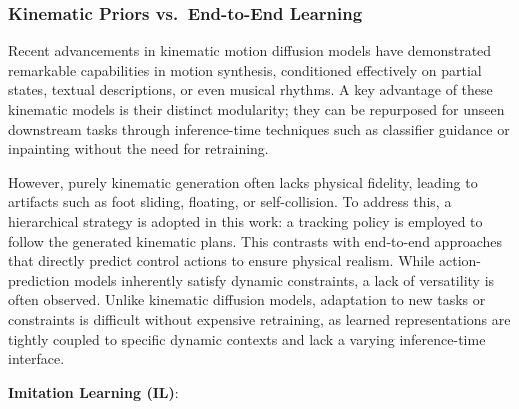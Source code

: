 \subsubsection{Kinematic Priors vs.~End-to-End Learning}
Recent advancements
in kinematic motion diffusion models have demonstrated remarkable
capabilities in motion synthesis, conditioned effectively on partial
states, textual descriptions, or even musical rhythms. A key advantage
of these kinematic models is their distinct modularity; they can be
repurposed for unseen downstream tasks through inference-time techniques
such as classifier guidance or inpainting without the need for
retraining.

However, purely kinematic generation often lacks physical fidelity,
leading to artifacts such as foot sliding, floating, or self-collision.
To address this, a hierarchical strategy is adopted in this work: a
tracking policy is employed to follow the generated kinematic plans.
This contrasts with end-to-end approaches that directly predict control
actions to ensure physical realism. While action-prediction models
inherently satisfy dynamic constraints, a lack of versatility is often
observed. Unlike kinematic diffusion models, adaptation to new tasks or
constraints is difficult without expensive retraining, as learned
representations are tightly coupled to specific dynamic contexts and
lack a varying inference-time interface.


\item
  \textbf{Imitation Learning (IL)}:

